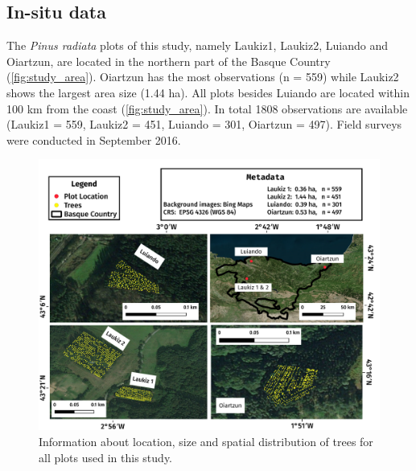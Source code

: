 \documentclass[letterpaper, peerreview, draftcls]{IEEEtran}
\begin{document}
\subsection{In-situ data}

The \textit{Pinus radiata} plots of this study, namely Laukiz1, Laukiz2, Luiando and Oiartzun, are located in the northern part of the Basque Country (\autoref{fig:study_area}).
Oiartzun has the most observations (n = 559) while Laukiz2 shows the largest area size (1.44 ha).
All plots besides Luiando are located within 100 km from the coast (\autoref{fig:study_area}).
In total 1808 observations are available (Laukiz1 = 559, Laukiz2 = 451, Luiando = 301, Oiartzun = 497).
Field surveys were conducted in September 2016.

\begin{figure} [ht!]
	\begin{center}
		\centering
		\includegraphics[width=\textwidth] {study-area-hyperspectral.pdf}
		\caption{Information about location, size and spatial distribution of trees for all plots used in this study.}\label{fig:study_area}
	\end{center}
\end{figure}

\end{document}

